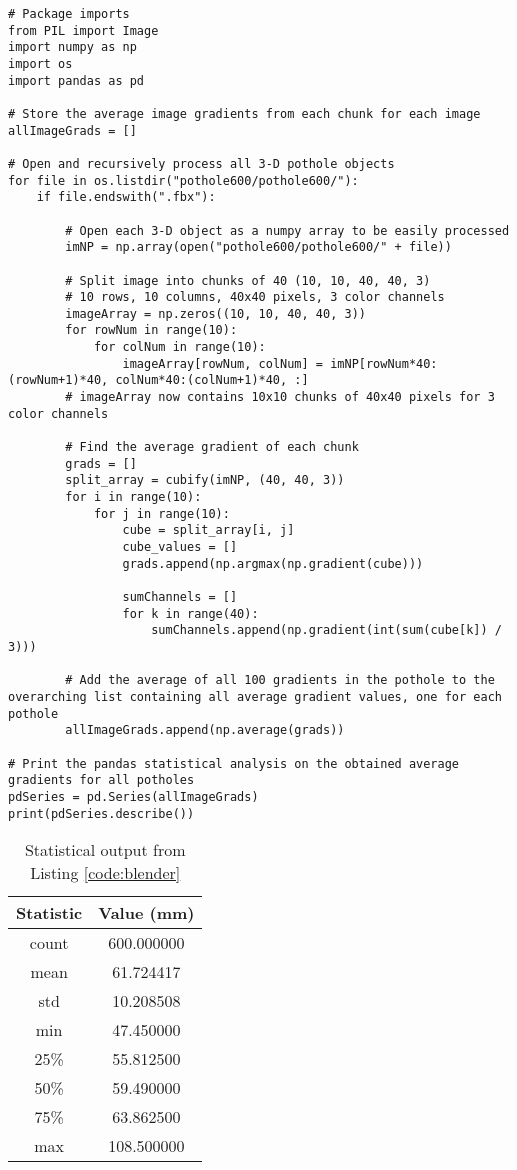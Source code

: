 \documentclass{article}
\begin{document}
\begin{code}
\label{code:blender}
\begin{verbatim}
# Package imports
from PIL import Image
import numpy as np
import os
import pandas as pd

# Store the average image gradients from each chunk for each image
allImageGrads = []

# Open and recursively process all 3-D pothole objects
for file in os.listdir("pothole600/pothole600/"):
    if file.endswith(".fbx"):

        # Open each 3-D object as a numpy array to be easily processed
        imNP = np.array(open("pothole600/pothole600/" + file))

        # Split image into chunks of 40 (10, 10, 40, 40, 3)
        # 10 rows, 10 columns, 40x40 pixels, 3 color channels
        imageArray = np.zeros((10, 10, 40, 40, 3))
        for rowNum in range(10):
            for colNum in range(10):
                imageArray[rowNum, colNum] = imNP[rowNum*40:(rowNum+1)*40, colNum*40:(colNum+1)*40, :]
        # imageArray now contains 10x10 chunks of 40x40 pixels for 3 color channels

        # Find the average gradient of each chunk
        grads = []
        split_array = cubify(imNP, (40, 40, 3))
        for i in range(10):
            for j in range(10):
                cube = split_array[i, j]
                cube_values = []
                grads.append(np.argmax(np.gradient(cube)))

                sumChannels = []
                for k in range(40):
                    sumChannels.append(np.gradient(int(sum(cube[k]) / 3)))

        # Add the average of all 100 gradients in the pothole to the overarching list containing all average gradient values, one for each pothole
        allImageGrads.append(np.average(grads))

# Print the pandas statistical analysis on the obtained average gradients for all potholes
pdSeries = pd.Series(allImageGrads)
print(pdSeries.describe())
\end{verbatim}
\end{code}

\begin{table}[h!]
\centering
\begin{tabular}{||c | c||} 
 \hline
 Statistic & Value (mm)\\  
 \hline\hline
 count & 600.000000\\ 
 \hline
 mean & 61.724417\\
 \hline
 std & 10.208508\\
 \hline
 min & 47.450000\\
 \hline
 25\% & 55.812500\\ 
 \hline
 50\% & 59.490000\\ 
 \hline
 75\% & 63.862500\\ 
 \hline
 max & 108.500000\\ 
 \hline
 \end{tabular}
 \caption{Statistical output from Listing \ref{code:blender}}
 \label{table:potholestats}
\end{table}
\end{document}
